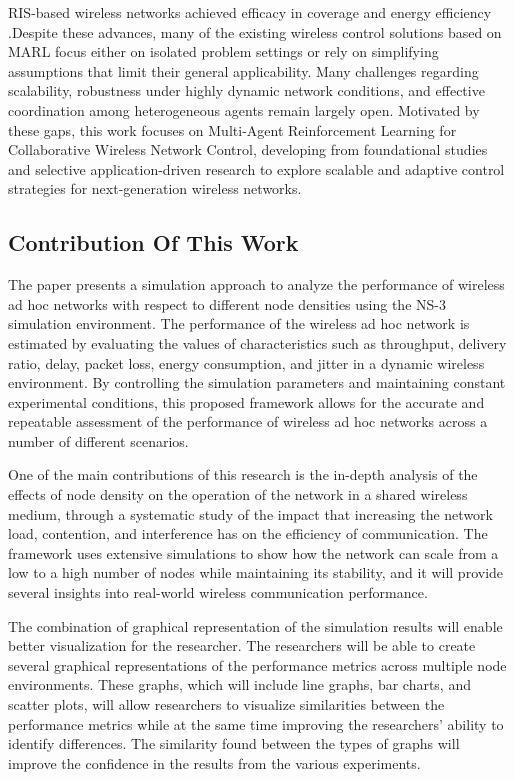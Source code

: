 \documentclass[a4paper,fleqn]{cas-dc}
\numberwithin{equation}{section}
\begin{document}
RIS-based wireless networks achieved efficacy in coverage and energy efficiency \cite{park2022cooperative}\cite{chen2026multi}.Despite these advances, many of the existing wireless control solutions based on MARL focus either on isolated problem settings or rely on simplifying assumptions that limit their general applicability. Many challenges regarding scalability, robustness under highly dynamic network conditions, and effective coordination among heterogeneous agents remain largely open. Motivated by these gaps, this work focuses on Multi-Agent Reinforcement Learning for Collaborative Wireless Network Control, developing from foundational studies \cite{chafii2023emergent}\cite{zhang2025multi}\cite{eldeeb2026offline} and selective application-driven research \cite{suzuki2023multi}\cite{zhao2023multi} to explore scalable and adaptive control strategies for next-generation wireless networks.


\subsection{Contribution Of This Work}
The paper presents a simulation approach to analyze the performance of wireless ad hoc networks with respect to different node densities using the NS-3 simulation environment. The performance of the wireless ad hoc network is estimated by evaluating the values of characteristics such as throughput, delivery ratio, delay, packet loss, energy consumption, and jitter in a dynamic wireless environment. By controlling the simulation parameters and maintaining constant experimental conditions, this proposed framework allows for the accurate and repeatable assessment of the performance of wireless ad hoc networks across a number of different scenarios.

One of the main contributions of this research is the in-depth analysis of the effects of node density on the operation of the network in a shared wireless medium, through a systematic study of the impact that increasing the network load, contention, and interference has on the efficiency of communication. The framework uses extensive simulations to show how the network can scale from a low to a high number of nodes while maintaining its stability, and it will provide several insights into real-world wireless communication performance.

The combination of graphical representation of the simulation results will enable better visualization for the researcher. The researchers will be able to create several graphical representations of the performance metrics across multiple node environments. These graphs, which will include line graphs, bar charts, and scatter plots, will allow researchers to visualize similarities between the performance metrics while at the same time improving the researchers' ability to identify differences. The similarity found between the types of graphs will improve the confidence in the results from the various experiments.
\end{document}
